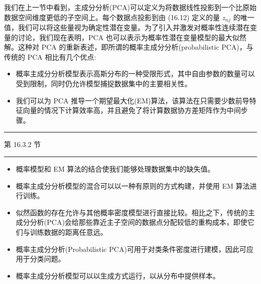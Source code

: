 \documentclass[10pt]{article}
\newcommand{\HRule}{\begin{center}\rule{0.9\linewidth}{0.2mm}\end{center}}
\begin{document}
我们在上一节中看到，主成分分析(PCA)可以定义为将数据线性投影到一个比原始数据空间维度更低的子空间上。每个数据点投影到由 (16.12) 定义的量 \({z}_{nj}\) 的唯一值，我们可以将这些量视为确定性潜在变量。为了引入并激发对概率性连续潜在变量的讨论，我们现在表明，PCA 也可以表示为概率性潜在变量模型的最大似然解。这种对 PCA 的重新表述，即所谓的概率主成分分析(probabilistic PCA)，与传统的 PCA 相比有几个优点:

\begin{itemize}
\item 概率主成分分析模型表示高斯分布的一种受限形式，其中自由参数的数量可以受到限制，同时仍允许模型捕捉数据集中的主要相关性。
\end{itemize}

\begin{itemize}
\item 我们可以为 PCA 推导一个期望最大化(EM)算法，该算法在只需要少数前导特征向量的情况下计算效率高，并且避免了将计算数据协方差矩阵作为中间步骤。
\end{itemize}

\HRule

第 16.3.2 节

\HRule

\begin{itemize}
\item 概率模型和 EM 算法的结合使我们能够处理数据集中的缺失值。
\end{itemize}

\begin{itemize}
\item 概率主成分分析模型的混合可以以一种有原则的方式构建，并使用 EM 算法进行训练。
\end{itemize}

\begin{itemize}
\item 似然函数的存在允许与其他概率密度模型进行直接比较。相比之下，传统的主成分分析(PCA)会给那些靠近主子空间的数据点分配较低的重构成本，即使它们与训练数据的距离任意远。
\end{itemize}

\begin{itemize}
\item 概率主成分分析(Probabilistic PCA)可用于对类条件密度进行建模，因此可应用于分类问题。
\end{itemize}

\begin{itemize}
\item 概率主成分分析模型可以以生成方式运行，以从分布中提供样本。
\end{itemize}
\end{document}
